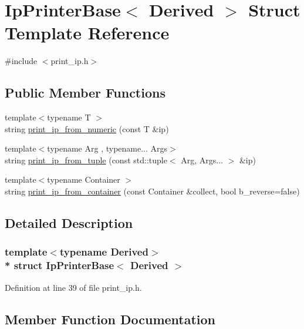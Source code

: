 \hypertarget{struct_ip_printer_base}{}\section{Ip\+Printer\+Base$<$ Derived $>$ Struct Template Reference}
\label{struct_ip_printer_base}


{\ttfamily \#include $<$print\+\_\+ip.\+h$>$}

\subsection*{Public Member Functions}
\begin{DoxyCompactItemize}
\item 
{\footnotesize template$<$typename T $>$ }\\string \hyperlink{struct_ip_printer_base_a598e5b30fdaf6e24a099cd2eea8eeddf}{print\+\_\+ip\+\_\+from\+\_\+numeric} (const T \&ip)
\item 
{\footnotesize template$<$typename Arg , typename... Args$>$ }\\string \hyperlink{struct_ip_printer_base_a0f19d29526c1d6ba5e0a7ec5eee011b1}{print\+\_\+ip\+\_\+from\+\_\+tuple} (const std\+::tuple$<$ Arg, Args... $>$ \&ip)
\item 
{\footnotesize template$<$typename Container $>$ }\\string \hyperlink{struct_ip_printer_base_a8b20f00707051af8fed2254c61e8a823}{print\+\_\+ip\+\_\+from\+\_\+container} (const Container \&collect, bool b\+\_\+reverse=false)
\end{DoxyCompactItemize}


\subsection{Detailed Description}
\subsubsection*{template$<$typename Derived$>$\\*
struct Ip\+Printer\+Base$<$ Derived $>$}



Definition at line 39 of file print\+\_\+ip.\+h.



\subsection{Member Function Documentation}
